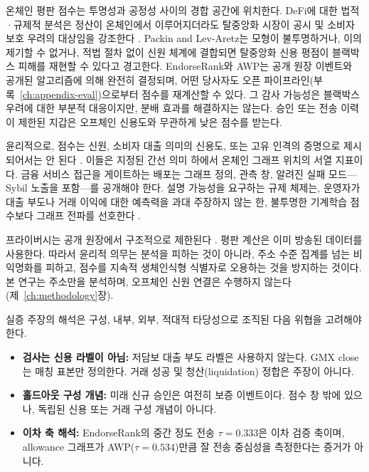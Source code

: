 
온체인 평판 점수는 투명성과 공정성 사이의 경합 공간에 위치한다. DeFi에 대한 법적·규제적 분석은 정산이 온체인에서 이루어지더라도 탈중앙화 시장이 공시 및 소비자 보호 우려의 대상임을 강조한다 . Packin and Lev-Aretz는 모형이 불투명하거나, 이의 제기할 수 없거나, 적법 절차 없이 신원 체계에 결합되면 탈중앙화 신용 평점이 블랙박스 피해를 재현할 수 있다고 경고한다. EndorseRank와 AWP는 공개 원장 이벤트와 공개된 알고리즘에 의해 완전히 결정되며, 어떤 당사자도 오픈 파이프라인(부록~\ref{ch:appendix-eval})으로부터 점수를 재계산할 수 있다. 그 감사 가능성은 블랙박스 우려에 대한 부분적 대응이지만, 분배 효과를 해결하지는 않는다. 승인 또는 전송 이력이 제한된 지갑은 오프체인 신용도와 무관하게 낮은 점수를 받는다.

윤리적으로, 점수는 신원, 소비자 대출 의미의 신용도, 또는 고유 인격의 증명으로 제시되어서는 안 된다 . 이들은 지정된 간선 의미 하에서 온체인 그래프 위치의 서열 지표이다. 금융 서비스 접근을 게이트하는 배포는 그래프 정의, 관측 창, 알려진 실패 모드---Sybil 노출을 포함---를 공개해야 한다. 설명 가능성을 요구하는 규제 체제는, 운영자가 대출 부도나 거래 이익에 대한 예측력을 과대 주장하지 않는 한, 불투명한 기계학습 점수보다 그래프 전파를 선호한다 .

프라이버시는 공개 원장에서 구조적으로 제한된다 . 평판 계산은 이미 방송된 데이터를 사용한다. 따라서 윤리적 의무는 분석을 피하는 것이 아니라, 주소 수준 집계를 넘는 비익명화를 피하고, 점수를 지속적 생체인식형 식별자로 오용하는 것을 방지하는 것이다. 본 연구는 주소만을 분석하며, 오프체인 신원 연결은 수행하지 않는다(제~\ref{ch:methodology}장).


실증 주장의 해석은 구성, 내부, 외부, 적대적 타당성으로 조직된 다음 위협을 고려해야 한다.


\begin{itemize}
\item \textbf{검사는 신용 라벨이 아님:} 저담보 대출 부도 라벨은 사용하지 않는다. GMX close는 매칭 표본만 정의한다. 거래 성공 및 청산(liquidation) 정합은 주장이 아니다.

\item \textbf{홀드아웃 구성 개념:} 미래 신규 승인은 여전히 보증 이벤트이다. 점수 창 밖에 있으나, 독립된 신용 또는 거래 구성 개념이 아니다.

\item \textbf{이차 축 해석:} EndorseRank의 중간 정도 전송 $\tau=0.333$은 이차 검증 축이며, allowance 그래프가 AWP($\tau=0.534$)만큼 잘 전송 중심성을 측정한다는 증거가 아니다.
\end{itemize}

